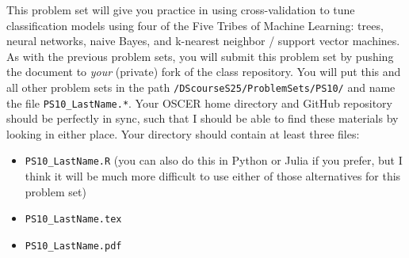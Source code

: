 \documentclass[12pt,english]{exam}
\begin{document}
This problem set will give you practice in using cross-validation to tune classification models using four of the Five Tribes of Machine Learning: trees, neural networks, naive Bayes, and k-nearest neighbor / support vector machines.
As with the previous problem sets, you will submit this problem set by pushing the document to \emph{your} (private) fork of the class repository. You will put this and all other problem sets in the path \texttt{/DScourseS25/ProblemSets/PS10/} and name the file \texttt{PS10\_LastName.*}. Your OSCER home directory and GitHub repository should be perfectly in sync, such that I should be able to find these materials by looking in either place. Your directory should contain at least three files:
\begin{itemize}
    \item \texttt{PS10\_LastName.R} (you can also do this in Python or Julia if you prefer, but I think it will be much more difficult to use either of those alternatives for this problem set)
    \item \texttt{PS10\_LastName.tex}
    \item \texttt{PS10\_LastName.pdf}
\end{itemize}
\end{document}
